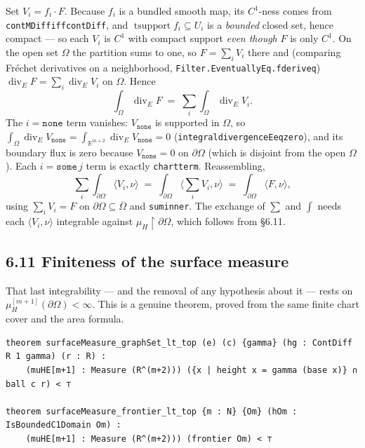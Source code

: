 ﻿\documentclass[12pt, a4paper]{article}
\renewcommand{\_}{\origunderscore\allowbreak}
\theoremstyle{definition}
\theoremstyle{plain}
\begin{document}
Set $V_i=f_i\cdot F$.  Because $f_i$ is a bundled smooth map, its $C^1$-ness comes from
\texttt{contMDiff\_iff\_contDiff}, and $\operatorname{tsupport}f_i\subseteq U_i$ is a \emph{bounded}
closed set, hence compact --- so each $V_i$ is $C^1$ with compact support \emph{even though} $F$ is
only $C^1$.  On the open set $\Omega$ the partition sums to one, so $F=\sum_i V_i$ there and
(comparing Fréchet derivatives on a neighborhood, \texttt{Filter.EventuallyEq.fderiv\_eq})
$\operatorname{div}_E F=\sum_i\operatorname{div}_E V_i$ on $\Omega$.  Hence
\[
  \int_\Omega\operatorname{div}_E F
    \;=\;\sum_i\int_\Omega\operatorname{div}_E V_i .
\]
The $i=\mathtt{none}$ term vanishes: $V_{\mathtt{none}}$ is supported in $\Omega$, so
$\int_\Omega\operatorname{div}_E V_{\mathtt{none}}=\int_{\mathbb{R}^{m+2}}\operatorname{div}_E
V_{\mathtt{none}}=0$ (\texttt{integral\_divergenceE\_eq\_zero}), and its boundary flux is zero because
$V_{\mathtt{none}}=0$ on $\partial\Omega$ (which is disjoint from the open $\Omega$).  Each
$i=\mathtt{some}\,j$ term is exactly \texttt{chart\_term}.  Reassembling,
\[
  \sum_i\int_{\partial\Omega}\langle V_i,\nu\rangle
    \;=\;\int_{\partial\Omega}\Big\langle\textstyle\sum_i V_i,\nu\Big\rangle
    \;=\;\int_{\partial\Omega}\langle F,\nu\rangle ,
\]
using $\sum_i V_i=F$ on $\partial\Omega\subseteq\overline\Omega$ and \texttt{sum\_inner}.  The
exchange of $\sum$ and $\int$ needs each $\langle V_i,\nu\rangle$ integrable against
$\mu_H\!\restriction\!\partial\Omega$, which follows from \S6.11.

\subsection{6.11 Finiteness of the surface measure}

That last integrability --- and the removal of any hypothesis about it --- rests on
$\mu_H^{[m+1]}(\partial\Omega)<\infty$.  This is a genuine theorem, proved from the same finite chart
cover and the area formula.

\begin{lstlisting}[caption={The boundary has finite surface measure}]
theorem surfaceMeasure_graphSet_lt_top (e) (c) {gamma} (hg : ContDiff R 1 gamma) (r : R) :
    (muHE[m+1] : Measure (R^(m+2))) ({x | height x = gamma (base x)} ∩ ball c r) < ⊤

theorem surfaceMeasure_frontier_lt_top {m : N} {Om} (hOm : IsBoundedC1Domain Om) :
    (muHE[m+1] : Measure (R^(m+2))) (frontier Om) < ⊤
\end{lstlisting}
\end{document}
